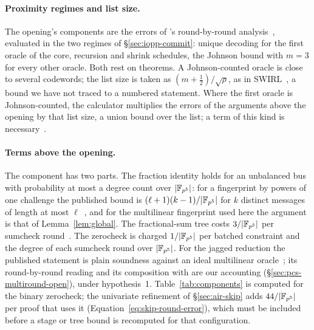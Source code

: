 \paragraph{Proximity regimes and list size.} The opening's components are the errors of \WHIR{}'s round-by-round analysis~\citep{whir}, evaluated in the two regimes of \S\ref{sec:iopp-commit}: unique decoding for the first oracle of the core, recursion and shrink schedules, the Johnson bound with $m = 3$ for every other oracle. Both rest on theorems. A Johnson-counted oracle is close to several codewords; the list size is taken as $(m + \tfrac12)/\sqrt\rho$, as in SWIRL~\citep{swirl}, a bound we have not traced to a numbered statement. Where the first oracle is Johnson-counted, the calculator multiplies the errors of the arguments above the opening by that list size, a union bound over the list; a term of this kind is necessary~\citep[Lemma~6]{fs26}.

\paragraph{Terms above the opening.} The \LogUp{} component has two parts. The fraction identity holds for an unbalanced bus with probability at most a degree count over $|\mathbb{F}_{p^5}|$: for a fingerprint by powers of one challenge the published bound is $(\ell+1)(k-1)/|\mathbb{F}_{p^5}|$ for $k$ distinct messages of length at most $\ell$~\citep[Thm.~3.4]{openvm-logup}, and for the multilinear fingerprint used here the argument is that of Lemma~\ref{lem:global}. The fractional-sum tree costs $3/|\mathbb{F}_{p^5}|$ per sumcheck round~\citep[Thm.~4.2.1]{swirl}. The zerocheck is charged $1/|\mathbb{F}_{p^5}|$ per batched constraint and the degree of each sumcheck round over $|\mathbb{F}_{p^5}|$. For the jagged reduction the published statement is plain soundness against an ideal multilinear oracle~\citep[Thm.~1.4]{jagged-pcs}; its round-by-round reading and its composition with \WHIR{} are our accounting (\S\ref{sec:pcs-multiround-open}), under hypothesis~1. Table~\ref{tab:components} is computed for the binary zerocheck; the univariate refinement of \S\ref{sec:air-skip} adds $44/|\mathbb{F}_{p^5}|$ per proof that uses it (Equation~\eqref{eq:skip-round-error}), which must be included before a stage or tree bound is recomputed for that configuration.

